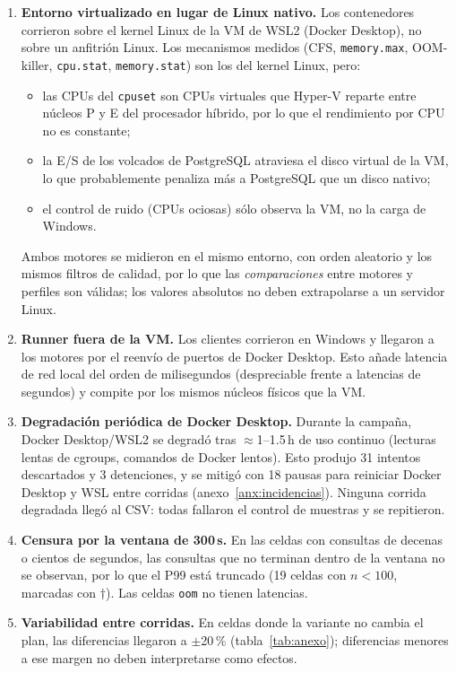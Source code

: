\documentclass[11pt,a4paper]{article}
\begin{document}
\begin{enumerate}[label=\textbf{\arabic*.}]
  \item \textbf{Entorno virtualizado en lugar de Linux nativo.} Los contenedores corrieron sobre el kernel Linux de la VM de WSL2 (Docker Desktop), no sobre un anfitrión Linux. Los mecanismos medidos (CFS, \texttt{memory.max}, OOM-killer, \texttt{cpu.stat}, \texttt{memory.stat}) son los del kernel Linux, pero:
  \begin{itemize}
    \item las CPUs del \texttt{cpuset} son CPUs virtuales que Hyper-V reparte entre núcleos P y E del procesador híbrido, por lo que el rendimiento por CPU no es constante;
    \item la E/S de los volcados de PostgreSQL atraviesa el disco virtual de la VM, lo que probablemente penaliza más a PostgreSQL que un disco nativo;
    \item el control de ruido (CPUs ociosas) sólo observa la VM, no la carga de Windows.
  \end{itemize}
  Ambos motores se midieron en el mismo entorno, con orden aleatorio y los mismos filtros de calidad, por lo que las \emph{comparaciones} entre motores y perfiles son válidas; los valores absolutos no deben extrapolarse a un servidor Linux.
  \item \textbf{Runner fuera de la VM.} Los clientes corrieron en Windows y llegaron a los motores por el reenvío de puertos de Docker Desktop. Esto añade latencia de red local del orden de milisegundos (despreciable frente a latencias de segundos) y compite por los mismos núcleos físicos que la VM.
  \item \textbf{Degradación periódica de Docker Desktop.} Durante la campaña, Docker Desktop/WSL2 se degradó tras $\approx$1--1.5\,h de uso continuo (lecturas lentas de cgroups, comandos de Docker lentos). Esto produjo 31 intentos descartados y 3 detenciones, y se mitigó con 18 pausas para reiniciar Docker Desktop y WSL entre corridas (anexo~\ref{anx:incidencias}). Ninguna corrida degradada llegó al CSV: todas fallaron el control de muestras y se repitieron.
  \item \textbf{Censura por la ventana de 300\,s.} En las celdas con consultas de decenas o cientos de segundos, las consultas que no terminan dentro de la ventana no se observan, por lo que el P99 está truncado (19 celdas con $n<100$, marcadas con $\dagger$). Las celdas \texttt{oom} no tienen latencias.
  \item \textbf{Variabilidad entre corridas.} En celdas donde la variante no cambia el plan, las diferencias llegaron a $\pm$20\,\% (tabla~\ref{tab:anexo}); diferencias menores a ese margen no deben interpretarse como efectos.

\end{enumerate}
\end{document}
